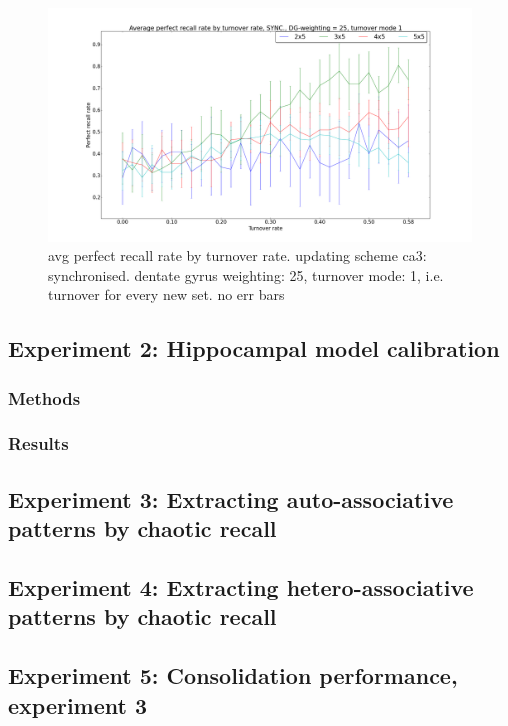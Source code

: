 \begin{figure}
    \centering
    \includegraphics[width=14cm]{fig/average_perfect_recall_rates_by_set_size_sync_dgw_25_t_m_1}
    \caption{avg perfect recall rate by turnover rate. updating scheme ca3: synchronised. dentate gyrus weighting: 25, turnover mode: 1, i.e. turnover for every new set. no err bars}
    \label{fig:average_perfect_recall_rates_by_set_size_sync_dgw_25_t_m_1}
\end{figure}

\subsection{Experiment 2: Hippocampal model calibration}
\subsubsection{Methods}
\subsubsection{Results}

\subsection{Experiment 3: Extracting auto-associative patterns by chaotic recall}
\subsection{Experiment 4: Extracting hetero-associative patterns by chaotic recall}

\subsection{Experiment 5: Consolidation performance, experiment 3}
